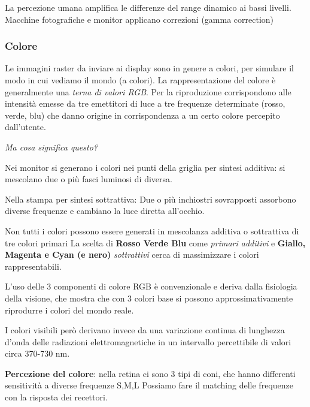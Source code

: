 \documentclass[a4paper, 10pt]{article}
\begin{document}
		\noindent
		La percezione umana amplifica le differenze del range dinamico ai bassi livelli. Macchine fotografiche e monitor applicano correzioni (gamma correction)
		
		\subsubsection{Colore}
			Le immagini raster da inviare ai display sono in genere a colori,
			per simulare il modo in cui vediamo il mondo (a colori).
			La rappresentazione del colore è generalmente una \textit{terna di
			valori RGB}.
			Per la riproduzione corrispondono alle intensità emesse da tre
			emettitori di luce a tre frequenze determinate (rosso, verde,
			blu) che danno origine in corrispondenza a un certo colore
			percepito dall'utente.
			
			\noindent
			\textit{Ma cosa significa questo?}
			
			\noindent
			Nei monitor si generano i colori nei punti della griglia per
			sintesi additiva: si mescolano due o più fasci luminosi di
			diversa.
			
			\noindent
			Nella stampa per sintesi sottrattiva: Due o più inchiostri
			sovrapposti assorbono diverse frequenze e cambiano la luce
			diretta all'occhio.
			
			\noindent
			Non tutti i colori possono essere generati in mescolanza
			additiva o sottrattiva di tre colori primari
			La scelta di \textbf{Rosso Verde Blu} come \textit{primari additivi} e \textbf{Giallo,
			Magenta e Cyan (e nero)} \textit{sottrattivi} cerca di massimizzare i
			colori rappresentabili.
			
			\begingroup
			\setlength\intextsep{0pt}
			\begin{figure}
				
				\vspace{-50pt}
			\end{figure}
			
			
			\noindent
			L'uso delle 3 componenti di colore RGB è
			convenzionale e deriva dalla fisiologia della
			visione, che mostra che con 3 colori base si
			possono approssimativamente riprodurre i
			colori del mondo reale.
			
			\noindent
			I colori visibili però derivano invece da una
			variazione continua di lunghezza d'onda delle
			radiazioni elettromagnetiche in un intervallo
			percettibile di valori circa 370-730 nm.
			
			\noindent
			\textbf{Percezione del colore}: nella retina ci sono 3 tipi di coni, che
			hanno differenti sensitività a diverse frequenze S,M,L
			Possiamo fare il matching delle frequenze con la risposta dei
			recettori.
			
\end{document}
